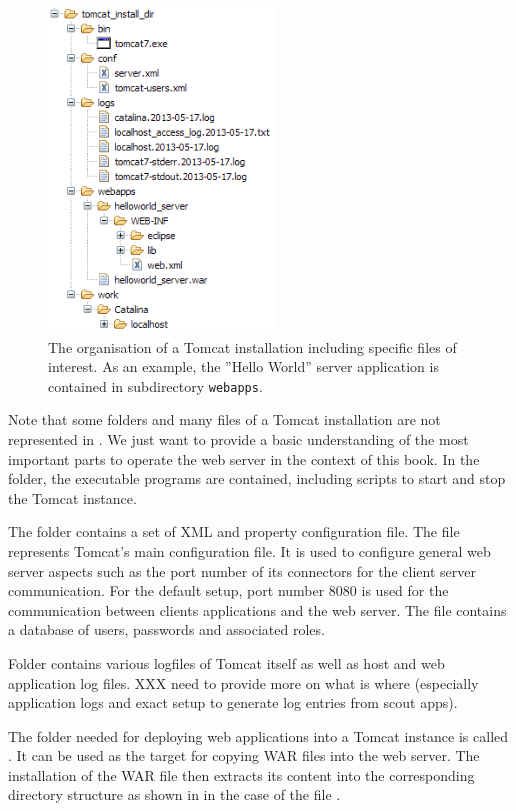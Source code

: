 \documentclass[a4paper,10pt,twoside]{book}
\begin{document}
\begin{figure}
\includegraphics[width=6cm]{tomcat_install_dir.png}
\caption{The organisation of a Tomcat installation including specific files of interest.
As an example, the ''Hello World'' server application is contained in subdirectory \texttt{webapps}.
}
\end{figure}

Note that some folders and many files of a Tomcat installation are not represented in .
We just want to provide a basic understanding of the most important parts to operate the web server in the context of this book.
In the  folder, the executable programs are contained, including scripts to start and stop the Tomcat instance.

The  folder contains a set of XML and property configuration file.
The file  represents Tomcat's main configuration file.
It is used to configure general web server aspects such as the port number of its connectors for the client server communication.
For the default setup, port number 8080 is used for the communication between clients applications and the web server.
The file  contains a database of users, passwords and associated roles.

Folder  contains various logfiles of Tomcat itself as well as host and web application log files.
XXX need to provide more on what is where (especially application logs and exact setup to generate log entries from scout apps).

The folder needed for deploying web applications into a Tomcat instance is called .
It can be used as the target for copying WAR files into the web server.
The installation of the WAR file then extracts its content into the corresponding directory structure as shown in  in the case of the file .
\end{document}
